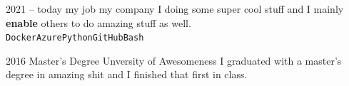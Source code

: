 \documentclass[8pt]{developercv}
\begin{document}


\begin{entrylist}
	\entry
		{2021 -- today}
		{my job}
		{\textcolor{t4v_white}{my company}}
		{I doing some super cool stuff and I mainly \textbf{enable} others to do amazing stuff as well. \\ \texttt{Docker}\slashsep\texttt{Azure}\slashsep\texttt{Python}\slashsep\texttt{GitHub}\slashsep\texttt{Bash}}
\end{entrylist}



\begin{entrylist}
	\entry
		{2016}
		{Master's Degree}
		{\textcolor{t4v_white}{Unversity of Awesomeness}}
		{I graduated with a master's degree in amazing shit and I finished that first in class.}
\end{entrylist}
\end{document}
